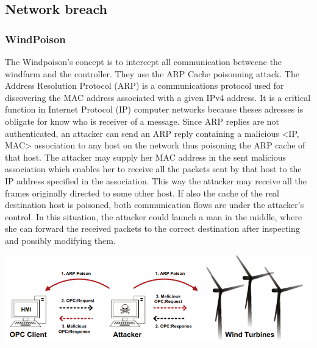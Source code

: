 \documentclass[twosided,a4,10pt]{article}
\begin{document}
\begin{multicols}{2}
\subsection{Network breach}

\subsubsection{WindPoison}
The Windpoison’s concept is to intercept all communication betweene the windfarm and the controller. They use the ARP Cache poisonning attack. The Address Resolution Protocol (ARP) is a communications protocol used for discovering the MAC address associated with a given IPv4 address. It is a critical function in Internet Protocol (IP) computer networks because theses adresses is obligate for know who is receiver of a message. \newline Since ARP replies are not authenticated, an attacker can send an ARP reply containing a malicious <IP, MAC> association to any host on the network thus poisoning the ARP cache of that host. The attacker may supply her MAC address in the sent malicious association which enables her to receive all the packets sent by that host to the IP address specified in the association. This way the attacker may receive all the
frames originally directed to some other host. If also the cache of the real destination host is poisoned, both communication flows are under the attacker's control. In this situation, the attacker could launch a man in the middle, where she can forward the received packets to the correct destination after inspecting and possibly modifying them. 

\end{multicols}
\includegraphics{cache_poison}
\end{document}
